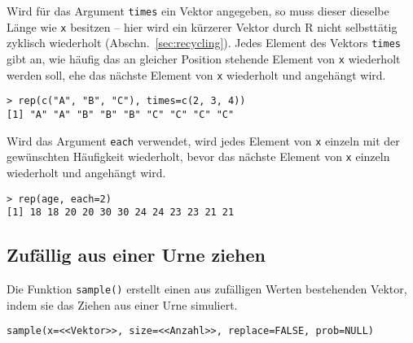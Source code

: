 Wird für das Argument \lstinline!times! ein Vektor angegeben, so muss dieser dieselbe Länge wie \lstinline!x! besitzen -- hier wird ein kürzerer Vektor durch R nicht selbsttätig zyklisch wiederholt (Abschn.\ \ref{sec:recycling}). Jedes Element des Vektors \lstinline!times! gibt an, wie häufig das an gleicher Position stehende Element von \lstinline!x! wiederholt werden soll, ehe das nächste Element von \lstinline!x! wiederholt und angehängt wird.
\begin{lstlisting}
> rep(c("A", "B", "C"), times=c(2, 3, 4))
[1] "A" "A" "B" "B" "B" "C" "C" "C" "C"
\end{lstlisting}

Wird das Argument \lstinline!each! verwendet, wird jedes Element von \lstinline!x! einzeln mit der gewünschten Häufigkeit wiederholt, bevor das nächste Element von \lstinline!x! einzeln wiederholt und angehängt wird.
\begin{lstlisting}
> rep(age, each=2)
[1] 18 18 20 20 30 30 24 24 23 23 21 21
\end{lstlisting}

\subsection{Zufällig aus einer Urne ziehen}
\label{sec:sample}

Die Funktion \lstinline!sample()! erstellt einen aus zufälligen Werten bestehenden Vektor, indem sie das Ziehen aus einer Urne simuliert.
\begin{lstlisting}
sample(x=<<Vektor>>, size=<<Anzahl>>, replace=FALSE, prob=NULL)
\end{lstlisting}

